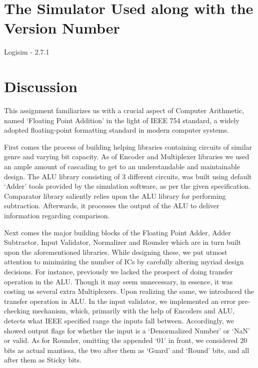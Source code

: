 \documentclass[12pt]{article}
\begin{document}
\newpage

\vspace{1cm}
\section{The Simulator Used along with the Version Number}
Logisim - 2.7.1


\newpage


\section{\large{Discussion}}

This assignment familiarizes us with a crucial aspect of Computer Arithmetic, named ‘Floating Point Addition’ in the light of IEEE 754 standard, a widely adopted floating-point formatting standard in modern computer systems.

\vspace{3mm}

First comes the process of building helping libraries containing circuits of similar genre and varying bit capacity. As of Encoder and Multiplexer libraries we used an ample amount of cascading to get to an understandable and maintainable design. The ALU library consisting of 3 different circuits, was built using default ‘Adder’ tools provided by the simulation software, as per the given specification. Comparator library saliently relies upon the ALU library for performing subtraction. Afterwards, it processes the output of the ALU to deliver information regarding comparison. 

\vspace{3mm} 

Next comes the major building blocks of the Floating Point Adder, Adder Subtractor, Input Validator, Normalizer and Rounder which are in turn built upon the aforementioned libraries. While designing these, we put utmost attention to minimizing the number of ICs by carefully altering myriad design decisions. For instance, previously we lacked the prospect of doing transfer operation in the ALU. Though it may seem unnecessary, in essence, it was costing us several extra Multiplexers. Upon realizing the same, we introduced the transfer operation in ALU. In the input validator, we implemented an error pre-checking mechanism, which, primarily with the help of Encoders and ALU, detects what IEEE specified range the inputs fall between. Accordingly, we showed output flags for whether the input is a ‘Denormalized Number’ or ‘NaN’ or valid. As for Rounder, omitting the appended ‘01’ in front, we considered 20 bits as actual mantissa, the two after them as ‘Guard’ and ‘Round’ bits, and all after them as Sticky bits. 
\end{document}
